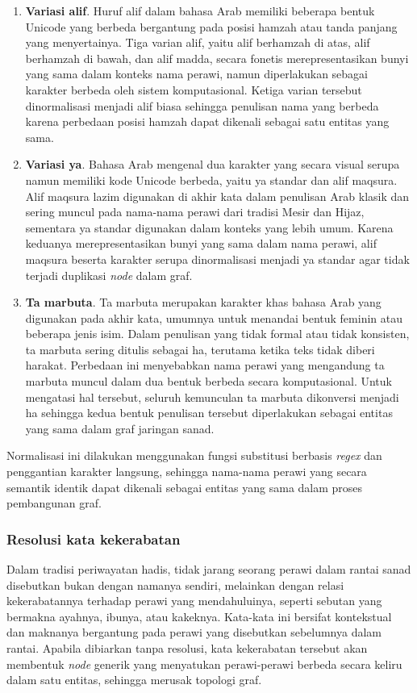 \begin{enumerate}
	\item \textbf{Variasi alif}. Huruf alif dalam bahasa Arab memiliki beberapa bentuk Unicode yang berbeda bergantung pada posisi hamzah atau tanda panjang yang menyertainya. Tiga varian alif, yaitu alif berhamzah di atas, alif berhamzah di bawah, dan alif madda, secara fonetis merepresentasikan bunyi yang sama dalam konteks nama perawi, namun diperlakukan sebagai karakter berbeda oleh sistem komputasional. Ketiga varian tersebut dinormalisasi menjadi alif biasa sehingga penulisan nama yang berbeda karena perbedaan posisi hamzah dapat dikenali sebagai satu entitas yang sama.

	\item \textbf{Variasi ya}. Bahasa Arab mengenal dua karakter yang secara visual serupa namun memiliki kode Unicode berbeda, yaitu ya standar dan alif maqsura. Alif maqsura lazim digunakan di akhir kata dalam penulisan Arab klasik dan sering muncul pada nama-nama perawi dari tradisi Mesir dan Hijaz, sementara ya standar digunakan dalam konteks yang lebih umum. Karena keduanya merepresentasikan bunyi yang sama dalam nama perawi, alif maqsura beserta karakter serupa dinormalisasi menjadi ya standar agar tidak terjadi duplikasi \textit{node} dalam graf.

	\item \textbf{Ta marbuta}. Ta marbuta merupakan karakter khas bahasa Arab yang digunakan pada akhir kata, umumnya untuk menandai bentuk feminin atau beberapa jenis isim. Dalam penulisan yang tidak formal atau tidak konsisten, ta marbuta sering ditulis sebagai ha, terutama ketika teks tidak diberi harakat. Perbedaan ini menyebabkan nama perawi yang mengandung ta marbuta muncul dalam dua bentuk berbeda secara komputasional. Untuk mengatasi hal tersebut, seluruh kemunculan ta marbuta dikonversi menjadi ha sehingga kedua bentuk penulisan tersebut diperlakukan sebagai entitas yang sama dalam graf jaringan sanad.
\end{enumerate}

\begin{sloppypar}
Normalisasi ini dilakukan menggunakan fungsi substitusi berbasis \textit{regex} dan penggantian karakter langsung, sehingga nama-nama perawi yang secara semantik identik dapat dikenali sebagai entitas yang sama dalam proses pembangunan graf.
\end{sloppypar}

\subsubsection{Resolusi kata kekerabatan}
Dalam tradisi periwayatan hadis, tidak jarang seorang perawi dalam rantai sanad disebutkan bukan dengan namanya sendiri, melainkan dengan relasi kekerabatannya terhadap perawi yang mendahuluinya, seperti sebutan yang bermakna ayahnya, ibunya, atau kakeknya. Kata-kata ini bersifat kontekstual dan maknanya bergantung pada perawi yang disebutkan sebelumnya dalam rantai. Apabila dibiarkan tanpa resolusi, kata kekerabatan tersebut akan membentuk \textit{node} generik yang menyatukan perawi-perawi berbeda secara keliru dalam satu entitas, sehingga merusak topologi graf.

